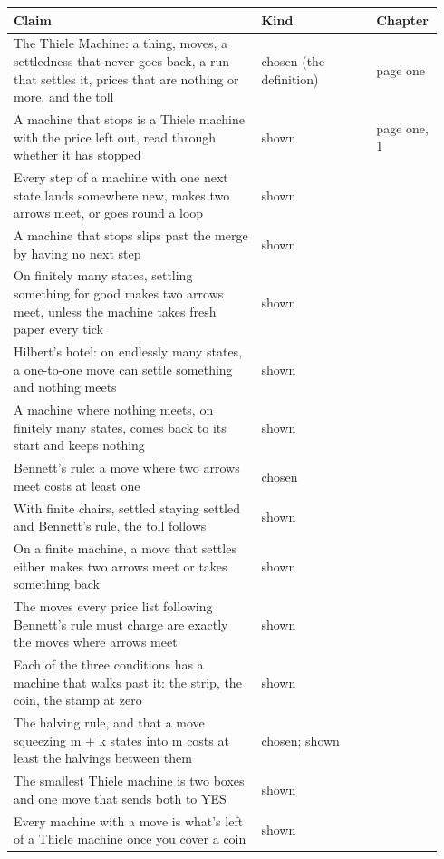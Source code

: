 \documentclass[11pt,twoside]{article}
\theoremstyle{thielethm}
\theoremstyle{thieledef}
\theoremstyle{thieledef}
\theoremstyle{thieledef}
\theoremstyle{thielethm}
\theoremstyle{thieleobs}
\theoremstyle{thielethm}
\begin{document}
\begingroup\small
\begin{longtable}{@{}>{\raggedright\arraybackslash}p{0.56\linewidth}>{\raggedright\arraybackslash}p{0.26\linewidth}>{\raggedright\arraybackslash}p{0.12\linewidth}@{}}
\toprule
\textbf{Claim} & \textbf{Kind} & \textbf{Chapter} \\
\midrule
\endhead
\bottomrule
\endlastfoot
The Thiele Machine: a thing, moves, a settledness that never goes back, a run that settles it, prices that are nothing or more, and the toll & chosen (the definition) & page one \\
A machine that stops is a Thiele machine with the price left out, read through whether it has stopped & shown & page one, 1 \\
Every step of a machine with one next state lands somewhere new, makes two arrows meet, or goes round a loop & shown & 1 \\
A machine that stops slips past the merge by having no next step & shown & 1 \\
On finitely many states, settling something for good makes two arrows meet, unless the machine takes fresh paper every tick & shown & 2 \\
Hilbert's hotel: on endlessly many states, a one-to-one move can settle something and nothing meets & shown & 2 \\
A machine where nothing meets, on finitely many states, comes back to its start and keeps nothing & shown & 2 \\
Bennett's rule: a move where two arrows meet costs at least one & chosen & 3 \\
With finite chairs, settled staying settled and Bennett's rule, the toll follows & shown & 3 \\
On a finite machine, a move that settles either makes two arrows meet or takes something back & shown & 3 \\
The moves every price list following Bennett's rule must charge are exactly the moves where arrows meet & shown & 3 \\
Each of the three conditions has a machine that walks past it: the strip, the coin, the stamp at zero & shown & 3 \\
The halving rule, and that a move squeezing m + k states into m costs at least the halvings between them & chosen; shown & 3 \\
The smallest Thiele machine is two boxes and one move that sends both to YES & shown & 4 \\
Every machine with a move is what's left of a Thiele machine once you cover a coin & shown & 4 \\

\end{longtable}
\end{document}

